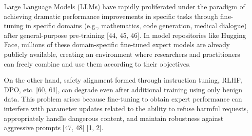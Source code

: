 \documentclass{article}
\begin{document}


Large Language Models (LLMs) have rapidly proliferated under the paradigm of achieving dramatic performance improvements in specific tasks through fine-tuning in specific domains (e.g., mathematics, code generation, medical dialogue) after general-purpose pre-training [44, 45, 46]. In model repositories like Hugging Face, millions of these domain-specific fine-tuned expert models are already publicly available, creating an environment where researchers and practitioners can freely combine and use them according to their objectives.

On the other hand, safety alignment formed through instruction tuning, RLHF, DPO, etc. [60, 61], can degrade even after additional training using only benign data. This problem arises because fine-tuning to obtain expert performance can interfere with parameter updates related to the ability to refuse harmful requests, appropriately handle dangerous content, and maintain robustness against aggressive prompts [47, 48] [1, 2].
\end{document}
